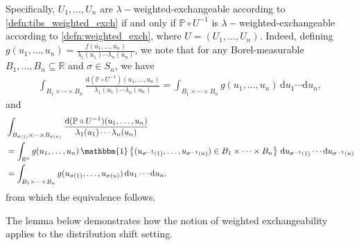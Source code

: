 \documentclass[11pt, titlepage]{article} %
\newcommand{\R}{\mathrm}
\newcommand{\Ind}[1]{\mathbbm{1}\left\{ #1 \right\}}
\numberwithin{equation}{section}
\theoremstyle{definition}
\numberwithin{theorem}{section}
\numberwithin{lemma}{section}
\numberwithin{corollary}{section}
\numberwithin{proposition}{section}
\numberwithin{definition}{section}
\numberwithin{remark}{section}
\begin{document}
\noindent
Specifically, \( U_1, \ldots, U_n\) are \(\lambda-\)weighted-exchangeable according to \cref{defn:tibs_weighted_exch} if and only if \(\mathbb{P} \circ U^{-1}\) is \(\lambda-\)weighted-exchangeable according to \cref{defn:weighted_exch}, where \(U = (U_1, \ldots, U_n)\). Indeed, defining \(g(u_1, \ldots, u_n) = \frac{f(u_1, \ldots, u_n)}{\lambda_1(u_1) \cdots \lambda_n(u_n)}\), we note that for any Borel-measurable \(B_1, \ldots, B_n \subseteq \mathbb{R}\) and \(\sigma \in S_n\), we have \begin{align*}
    \int_{B_1 \times \cdots \times B_n}\frac{\R{d}(\mathbb{P} \circ U^{-1})(u_1, \ldots, u_n)}{\lambda_1(u_1) \cdots \lambda_n(u_n)} = \int_{B_1 \times \cdots \times B_n} g(u_1, \ldots, u_n) \, \R{d}u_1 \cdots \R{d}u_n,
\end{align*}
\noindent
and
\begin{align*}
    &\int_{B_{\sigma(1)} \times \cdots \times B_{\sigma(n)}}\frac{\R{d}(\mathbb{P} \circ U^{-1})(u_1, \ldots, u_n)}{\lambda_1(u_1) \cdots \lambda_n(u_n)} \\
    &= \int_{\mathbb{R}^n} g(u_1, \ldots, u_n) \, \Ind{(u_{\sigma^{-1}(1)}, \ldots, u_{\sigma^{-1}(n)}) \in B_1 \times \cdots \times B_n} \, \R{d}u_{\sigma^{-1}(1)} \cdots \R{d}u_{\sigma^{-1}(n)} \\
    &= \int_{B_1 \times \cdots \times B_n} g(u_{\sigma(1)}, \ldots, u_{\sigma(n)}) \, \R{d}u_{1} \cdots \R{d}u_{n}, 
\end{align*} 
from which the equivalence follows. \vskip5pt

\noindent
The lemma below demonstrates how the notion of weighted exchangeability applies to the distribution shift setting.
\end{document}
